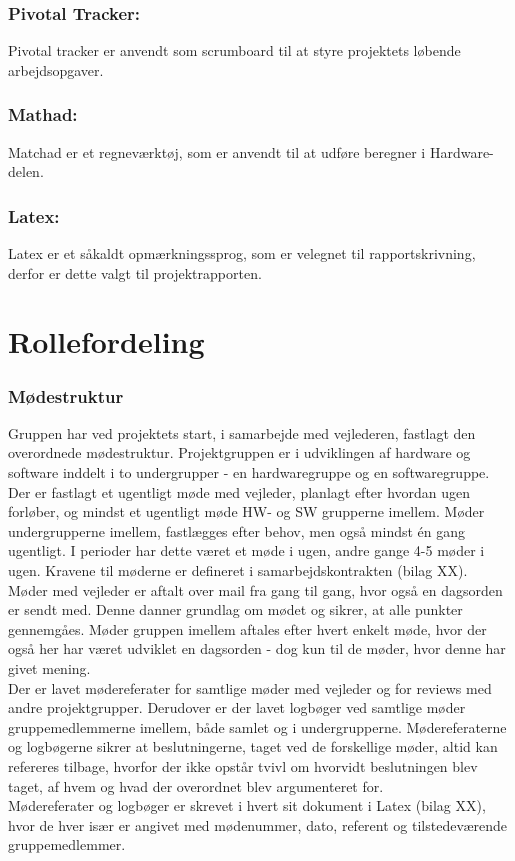\subsubsection{Pivotal Tracker:}
Pivotal tracker er anvendt som scrumboard til at styre projektets løbende arbejdsopgaver. 
\subsubsection{Mathad:}
Matchad er et regneværktøj, som er anvendt til at udføre beregner i Hardware-delen. 
\subsubsection{Latex:}
Latex er et såkaldt opmærkningssprog, som er velegnet til rapportskrivning, derfor er dette valgt til projektrapporten. 

\section{Rollefordeling}
\subsubsection{Mødestruktur}
Gruppen har ved projektets start, i samarbejde med vejlederen, fastlagt den overordnede mødestruktur. Projektgruppen er i udviklingen af hardware og software inddelt i to undergrupper - en hardwaregruppe og en softwaregruppe. Der er fastlagt et ugentligt møde med vejleder, planlagt efter hvordan ugen forløber, og mindst et ugentligt møde HW- og SW grupperne imellem. Møder  undergrupperne imellem, fastlægges efter behov, men også mindst én gang ugentligt. I perioder har dette været et møde i ugen, andre gange 4-5 møder i ugen. Kravene til møderne er defineret i samarbejdskontrakten (bilag XX). \\
\newline
Møder med vejleder er aftalt over mail fra gang til gang, hvor også en dagsorden er sendt med. Denne danner grundlag om mødet og sikrer, at alle punkter gennemgåes. Møder gruppen imellem aftales efter hvert enkelt møde, hvor der også her har været udviklet en dagsorden - dog kun til de møder, hvor denne har givet mening.\\
\newline
Der er lavet mødereferater for samtlige møder med vejleder og for reviews med andre projektgrupper. Derudover er der lavet logbøger ved samtlige møder gruppemedlemmerne imellem, både samlet og i undergrupperne. Mødereferaterne og logbøgerne sikrer at beslutningerne, taget ved de forskellige møder, altid kan refereres tilbage, hvorfor der ikke opstår tvivl om hvorvidt beslutningen blev taget, af hvem og hvad der overordnet blev argumenteret for.\\
Mødereferater og logbøger er skrevet i hvert sit dokument i Latex (bilag XX), hvor de hver især er angivet med mødenummer, dato, referent og tilstedeværende gruppemedlemmer.  

